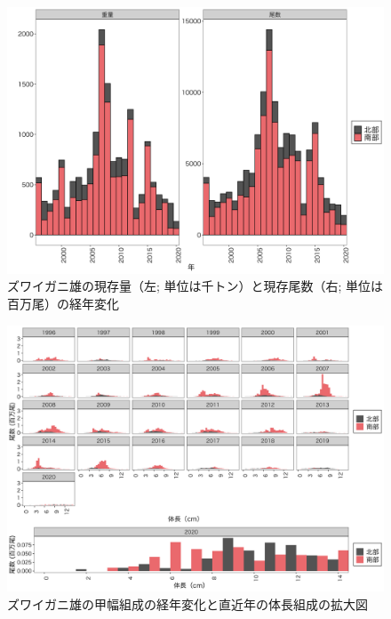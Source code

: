 \documentclass[11pt]{article} %
\begin{document}
\begin{linenumbers}
\begin{figure}[h]
  \centering
  \includegraphics[width = 14cm]{ズワイガニ雄trend.png}
  \caption{ズワイガニ雄の現存量（左; 単位は千トン）と現存尾数（右; 単位は百万尾）の経年変化}
\end{figure}

\begin{figure}[h]
  \centering
  \includegraphics[width = 14cm]{ズワイガニ雄length.png}
  \caption{ズワイガニ雄の甲幅組成の経年変化と直近年の体長組成の拡大図}
\end{figure}


\end{linenumbers}
\end{document}
